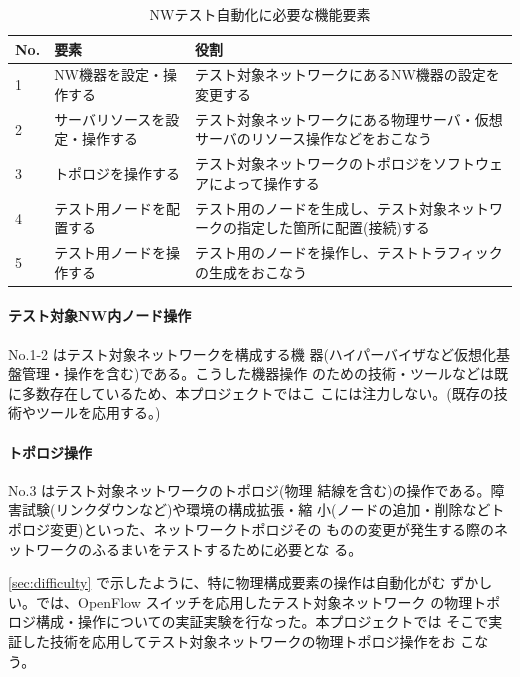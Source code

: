\begin{table}[h]
 \caption{NWテスト自動化に必要な機能要素}
 \label{tab:test-functions}
 \begin{tabularx}{\linewidth}{l|l|X}
  \hline
  No. & 要素 & 役割 \\ \hline
  \hline
  1 & NW機器を設定・操作する & テスト対象ネットワークにあるNW機器の設定を変更する \\ \hline
  2 & サーバリソースを設定・操作する & テスト対象ネットワークにある物理サーバ・仮想サーバのリソース操作などをおこなう \\ \hline
  3 & トポロジを操作する & テスト対象ネットワークのトポロジをソフトウェアによって操作する \\ \hline
  4 & テスト用ノードを配置する & テスト用のノードを生成し、テスト対象ネットワークの指定した箇所に配置(接続)する \\ \hline
  5 &テスト用ノードを操作する & テスト用のノードを操作し、テストトラフィックの生成をおこなう\\ \hline
 \end{tabularx}
\end{table}

    \paragraph{テスト対象NW内ノード操作}
 No.1-2 はテスト対象ネットワークを構成する機
器(ハイパーバイザなど仮想化基盤管理・操作を含む)である。こうした機器操作
のための技術・ツールなどは既に多数存在しているため、本プロジェクトではこ
こには注力しない。(既存の技術やツールを応用する。)

    \paragraph{トポロジ操作}
 No.3 はテスト対象ネットワークのトポロジ(物理
結線を含む)の操作である。障害試験(リンクダウンなど)や環境の構成拡張・縮
小(ノードの追加・削除などトポロジ変更)といった、ネットワークトポロジその
ものの変更が発生する際のネットワークのふるまいをテストするために必要とな
る。

\ref{sec:difficulty} で示したように、特に物理構成要素の操作は自動化がむ
ずかしい。\lopjc では、OpenFlow スイッチを応用したテスト対象ネットワーク
の物理トポロジ構成・操作についての実証実験を行なった。本プロジェクトでは
そこで実証した技術を応用してテスト対象ネットワークの物理トポロジ操作をお
こなう。

